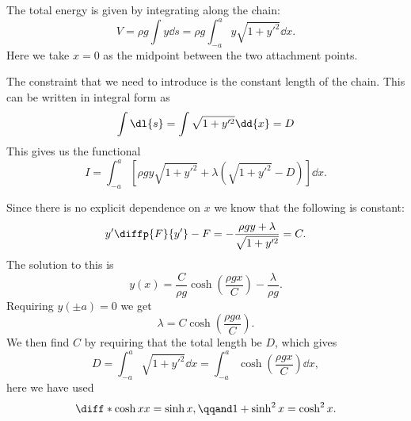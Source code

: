 \documentclass[fleqn]{NotesClass}
\begin{document}
    The total energy is given by integrating along the chain:
    \begin{equation}
        V = \rho g\int y \dd{s} = \rho g \int_{-a}^{a} y\sqrt{1 + y'^2} \dd{x}.
    \end{equation}
    Here we take \(x = 0\) as the midpoint between the two attachment points.
    
    The constraint that we need to introduce is the constant length of the chain.
    This can be written in integral form as
    \begin{equation}
        \int \dl{s} = \int \sqrt{1 + y'^2} \dd{x} = D
    \end{equation}
    This gives us the functional
    \begin{equation}
        I = \int_{-a}^{a} \left[ \rho gy\sqrt{1 + y'^2} + \lambda\left( \sqrt{1 + y'^2} - D \right) \right] \dd{x}.
    \end{equation}
    
    Since there is no explicit dependence on \(x\) we know that the following is constant:
    \begin{equation}
        y' \diffp{F}{y'} - F = -\frac{\rho gy + \lambda}{\sqrt{1 + y'^2}} = C.
    \end{equation}
    The solution to this is
    \begin{equation}
        y(x) = \frac{C}{\rho g} \cosh\left( \frac{\rho g x}{C} \right) - \frac{\lambda}{\rho g}.
    \end{equation}
    Requiring \(y(\pm a) = 0\) we get
    \begin{equation}
        \lambda = C \cosh\left( \frac{\rho g a}{C} \right).
    \end{equation}
    We then find \(C\) by requiring that the total length be \(D\), which gives
    \begin{equation}
        D = \int_{-a}^{a}\sqrt{1 + y'^2} \dd{x} = \int_{-a}^{a} \cosh\left( \frac{\rho g x}{C} \right) \dd{x},
    \end{equation}
    here we have used
    \begin{equation}
        \diff*{\cosh x}{x} = \sinh x, \qqand 1 + \sinh^2 x = \cosh^2 x.
    \end{equation}
    
\end{document}
